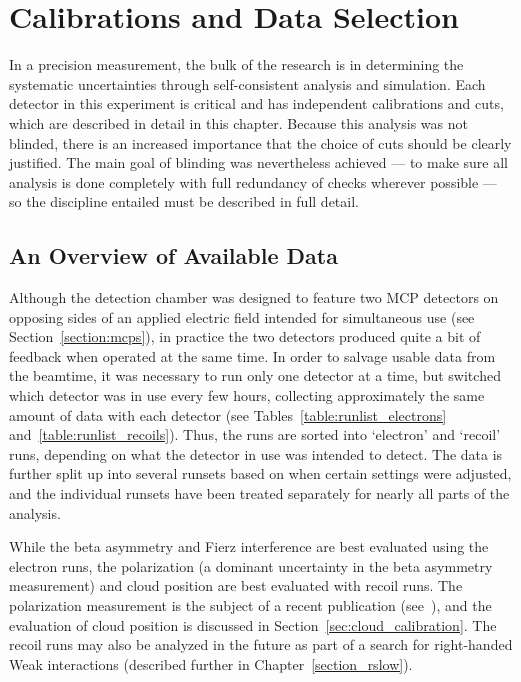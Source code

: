 %
%
%
\clearpage
\chapter{Calibrations and Data Selection}
\label{calibrations_chapter}
\label{dataselection_chapter}
In a precision measurement, the bulk of the research is in determining the systematic uncertainties through self-consistent analysis and simulation.  Each detector in this experiment is critical and has independent calibrations and cuts, which are described in detail in this chapter.  Because this analysis was not blinded, there is an increased importance that the choice of cuts should be clearly justified.  The main goal of blinding was nevertheless achieved --- to make sure all analysis is done completely with full redundancy of checks wherever possible --- so the discipline entailed must be described in full detail.
 

\section{An Overview of Available Data}
\label{sec:data_overview}
Although the detection chamber was designed to feature two MCP detectors on opposing sides of an applied electric field intended for simultaneous use (see Section~\ref{section:mcps}), in practice the two detectors produced quite a bit of feedback when operated at the same time.  In order to salvage usable data from the beamtime, it was necessary to run only one detector at a time, but switched which detector was in use every few hours, collecting approximately the same amount of data with each detector (see Tables~\ref{table:runlist_electrons} and~\ref{table:runlist_recoils}).  Thus, the runs are sorted into `electron' and `recoil' runs, depending on what the detector in use was intended to detect.  The data is further split up into several runsets based on when certain settings were adjusted, and the individual runsets have been treated separately for nearly all parts of the analysis.  




While the beta asymmetry and Fierz interference are best evaluated using the electron runs, the polarization (a dominant uncertainty in the beta asymmetry measurement) and cloud position are best evaluated with recoil runs.  The polarization measurement is the subject of a recent publication (see~\cite{ben_OP}), and the evaluation of cloud position is discussed in Section~\ref{sec:cloud_calibration}.  
The recoil runs may also be analyzed in the future as part of a search for right-handed Weak interactions (described further in Chapter~\ref{section_rslow}).


